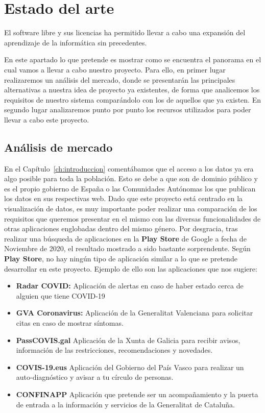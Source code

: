 \chapter{Estado del arte}

El software libre y sus licencias \cite{gplv3} ha permitido llevar a cabo una expansión del
aprendizaje de la informática sin precedentes.

En este apartado lo que pretende es mostrar como se encuentra el panorama en el cual vamos a llevar a cabo nuestro proyecto. Para ello, en primer lugar realizaremos un análisis del mercado, donde se presentarán las principales alternativas a nuestra idea de proyecto ya existentes, de forma que analicemos los requisitos de nuestro sistema comparándolo con los de aquellos que ya existen. En segundo lugar analizaremos punto por punto los recursos utilizados para poder llevar a cabo este proyecto.

\section{Análisis de mercado}

En el Capítulo~\ref{ch:introduccion} comentábamos que el acceso a los datos ya era algo posible para toda la población. Esto se debe a que son de dominio público y es el propio gobierno de España o las Comunidades Autónomas los que publican los datos en sus respectivas web. Dado que este proyecto está centrado en la visualización de datos, es muy importante poder realizar una comparación de los requisitos que queremos presentar en el mismo con las diversas funcionalidades de otras aplicaciones englobadas dentro del mismo género. Por desgracia, tras realizar una búsqueda de aplicaciones en la \textbf{Play Store} de Google a fecha de Noviembre de 2020, el resultado mostrado a sido bastante sorprendente. Según \textbf{Play Store}, no hay ningún tipo de aplicación similar a lo que se pretende desarrollar en este proyecto. Ejemplo de ello son las aplicaciones que nos sugiere:

\begin{itemize}
	\item \textbf{Radar COVID:} Aplicación de alertas en caso de haber estado cerca de alguien que tiene COVID-19
	\item \textbf{GVA Coronavirus:} Aplicación de la Generalitat Valenciana para solicitar citas en caso de mostrar síntomas.
	\item \textbf{PassCOVIS.gal} Aplicación de la Xunta de Galicia para recibir avisos, información de las restricciones, recomendaciones y novedades.
	\item \textbf{COVIS-19.eus} Aplicación del Gobierno del País Vasco para realizar un auto-diagnóstico y avisar a tu círculo de personas.
	\item \textbf{CONFINAPP} Aplicación que pretende ser un acompañamiento y la puerta de entrada a la información y servicios de la Generalitat de Cataluña.
\end{itemize}

